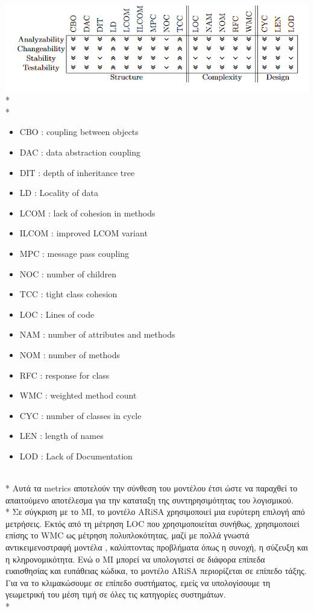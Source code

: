 \documentclass[a4paper, 11pt]{article}
\begin{document}
{{\includegraphics{images/arisa compendium.png}\\*
\\*
\begin{itemize}
\item \textlatin{CBO : coupling between objects}
\item \textlatin{DAC : data abstraction coupling}
\item \textlatin{DIT : depth of inheritance tree} 
\item \textlatin{LD  : Locality of data} 
\item \textlatin{LCOM : lack of cohesion in methods}
\item \textlatin{ILCOM : improved LCOM variant}
\item \textlatin{MPC : message pass coupling}
\item \textlatin{NOC : number of children} 
\item \textlatin{TCC : tight class cohesion}
\item \textlatin{LOC : Lines of code}
\item \textlatin{NAM : number of attributes and methods}
\item \textlatin{NOM : number of methods}
\item \textlatin{RFC : response for class}
\item \textlatin{WMC : weighted method count}
\item \textlatin{CYC : number of classes in cycle}
\item \textlatin{LEN : length of names}
\item \textlatin{LOD : Lack of Documentation}
\end{itemize}
\\*
Αυτά τα \textlatin{metrics} αποτελούν την σύνθεση του μοντέλου έτσι ώστε να παραχθεί το απαιτούμενο αποτέλεσμα για την καταταξη της συντηρησιμότητας του λογισμικού.
\\*
Σε σύγκριση με το MI, το μοντέλο \textlatin{ARiSA} χρησιμοποιεί μια ευρύτερη επιλογή από 
μετρήσεις. Εκτός από τη μέτρηση \textlatin{LOC} που χρησιμοποιείται συνήθως, χρησιμοποιεί επίσης το \textlatin{WMC}
ως μέτρηση πολυπλοκότητας, μαζί με πολλά γνωστά αντικειμενοστραφή μοντέλα ,
καλύπτοντας προβλήματα όπως η συνοχή, η σύζευξη και η κληρονομικότητα.
Ενώ ο MI μπορεί να υπολογιστεί σε διάφορα επίπεδα ευαισθησίας και ευπάθειας κώδικα,  το
μοντέλο \textlatin{ARiSA} περιορίζεται σε επίπεδο τάξης. Για να το κλιμακώσουμε σε επίπεδο συστήματος, εμείς
να υπολογίσουμε τη γεωμετρική του μέση τιμή σε όλες τις κατηγορίες συστημάτων.
\\*


}}
\end{document}
